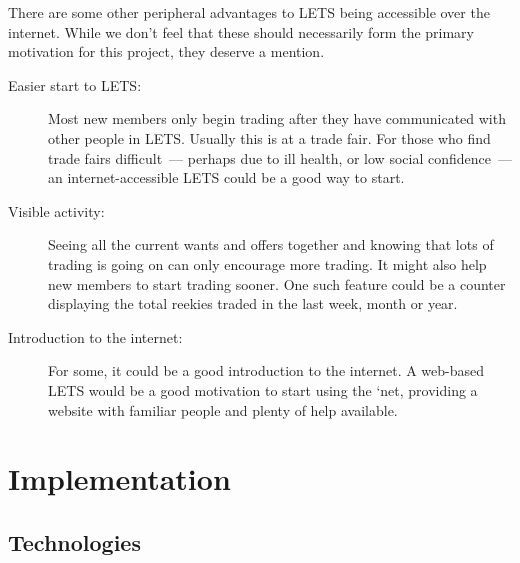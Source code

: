 \documentclass[a4paper,11pt]{article}
\begin{document}
There are some other peripheral advantages to LETS being accessible over the internet. While we don't feel that these should necessarily form the primary motivation for this project, they deserve a mention.

\begin{description}
\item[Easier start to LETS:] Most new members only begin trading after they have communicated with other people in LETS. Usually this is at a trade fair. For those who find trade fairs difficult~--- perhaps due to ill health, or low social confidence~--- an internet-accessible LETS could be a good way to start.
\item[Visible activity:] Seeing all the current wants and offers together and knowing that lots of trading is going on can only encourage more trading. It might also help new members to start trading sooner. One such feature could be a counter displaying the total reekies traded in the last week, month or year.
\item[Introduction to the internet:] For some, it could be a good introduction to the internet. A web-based LETS would be a good motivation to start using the `net, providing a website with familiar people and plenty of help available.
\end{description}


\clearpage %

\section{Implementation}


\subsection{Technologies}
\end{document}
